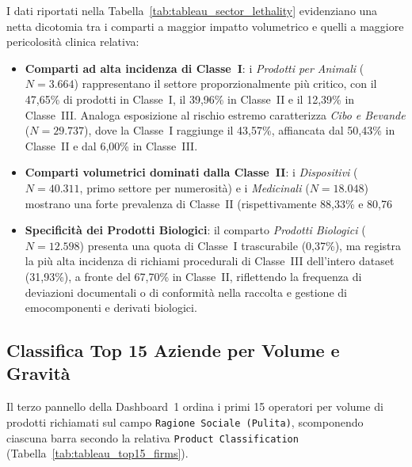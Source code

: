 I dati riportati nella Tabella~\ref{tab:tableau_sector_lethality} evidenziano una netta dicotomia tra i comparti a maggior impatto volumetrico e quelli a maggiore pericolosità clinica relativa:
\begin{itemize}
    \item \textbf{Comparti ad alta incidenza di Classe~I}: i \textit{Prodotti per Animali} ($N = 3.664$) rappresentano il settore proporzionalmente più critico, con il 47,65\% di prodotti in Classe~I, il 39,96\% in Classe~II e il 12,39\% in Classe~III. Analoga esposizione al rischio estremo caratterizza \textit{Cibo e Bevande} ($N = 29.737$), dove la Classe~I raggiunge il 43,57\%, affiancata dal 50,43\% in Classe~II e dal 6,00\% in Classe~III.
    \item \textbf{Comparti volumetrici dominati dalla Classe~II}: i \textit{Dispositivi} ($N = 40.311$, primo settore per numerosità) e i \textit{Medicinali} ($N = 18.048$) mostrano una forte prevalenza di Classe~II (rispettivamente 88,33\% e 80,76%
    \item \textbf{Specificità dei Prodotti Biologici}: il comparto \textit{Prodotti Biologici} ($N = 12.598$) presenta una quota di Classe~I trascurabile (0,37\%), ma registra la più alta incidenza di richiami procedurali di Classe~III dell'intero dataset (31,93\%), a fronte del 67,70\% in Classe~II, riflettendo la frequenza di deviazioni documentali o di conformità nella raccolta e gestione di emocomponenti e derivati biologici.
\end{itemize}

\subsection{Classifica Top 15 Aziende per Volume e Gravità}

Il terzo pannello della Dashboard~1 ordina i primi 15 operatori per volume di prodotti richiamati sul campo \texttt{Ragione Sociale (Pulita)}, scomponendo ciascuna barra secondo la relativa \texttt{Product Classification} (Tabella~\ref{tab:tableau_top15_firms}).

